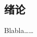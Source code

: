 \documentclass[12pt,oneside,openany,a4paper]{book}
\begin{document}
\begin{CJK*}{GBK}{song}
\titleformat{\chapter}[hang]{\centering\LARGE\bfseries}{\chaptername}{1em}{}
\renewcommand{\chaptername}{第\CJKnumber{\thechapter}章}
\renewcommand{\contentsname}{目\quad 录}

\tableofcontents

\chapter{绪论}

Blabla……

\end{CJK*} 
\end{document}
